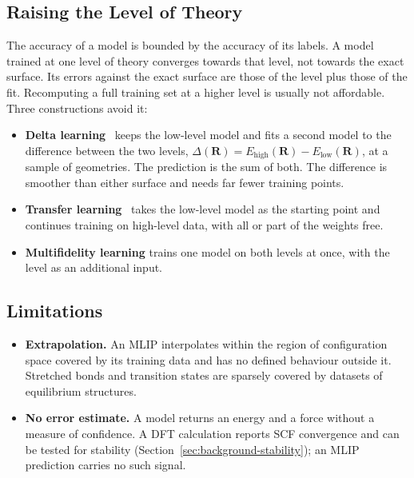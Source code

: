 \subsection{Raising the Level of Theory}
\label{sec:mlip-fidelity}

The accuracy of a model is bounded by the accuracy of its labels. A model
trained at one level of theory converges towards that level, not towards
the exact surface. Its errors against the exact surface are those of the
level plus those of the fit. Recomputing a full training set at a higher
level is usually not affordable. Three constructions avoid it:

\begin{itemize}
  \item \textbf{Delta learning}~\cite{ramakrishnan2015} keeps the
    low-level model and fits a second model to the difference between the
    two levels, $\Delta(\mathbf{R}) = E_\text{high}(\mathbf{R}) -
    E_\text{low}(\mathbf{R})$, at a sample of geometries. The prediction
    is the sum of both. The difference is smoother than either surface
    and needs far fewer training points.
  \item \textbf{Transfer learning}~\cite{smith2019ani1ccx} takes the
    low-level model as the starting point and continues training on
    high-level data, with all or part of the weights free.
  \item \textbf{Multifidelity learning} trains one model on both levels
    at once, with the level as an additional input.
\end{itemize}

\subsection{Limitations}
\label{sec:mlip-limits}

\begin{itemize}
  \item \textbf{Extrapolation.} An MLIP interpolates within the region of
    configuration space covered by its training data and has no defined
    behaviour outside it. Stretched bonds and transition states are
    sparsely covered by datasets of equilibrium structures.
  \item \textbf{No error estimate.} A model returns an energy and a force
    without a measure of confidence. A DFT calculation reports SCF
    convergence and can be tested for stability
    (Section~\ref{sec:background-stability}); an MLIP prediction carries
    no such signal.
\end{itemize}

